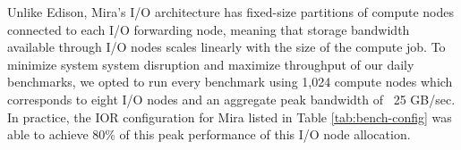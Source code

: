Unlike Edison, Mira's I/O architecture has fixed-size partitions of compute nodes connected to each I/O forwarding node, 
meaning that storage bandwidth available through I/O nodes scales linearly with the size of the compute job.
To minimize system system disruption and maximize throughput of our daily benchmarks, we opted to run every benchmark using 1,024 compute nodes which 
corresponds to eight I/O nodes and an aggregate peak bandwidth of ~25 GB/sec.
In practice, the IOR configuration for Mira listed in Table \ref{tab:bench-config} was able to achieve 80\% of this peak performance of this I/O node allocation.
